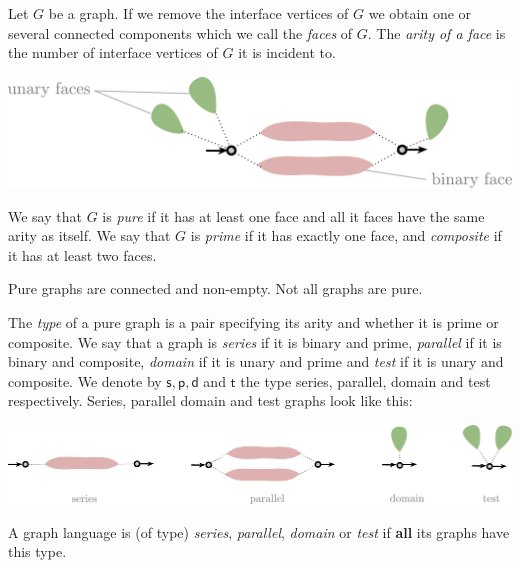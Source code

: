 \begin{definition}
Let $G$ be a graph. If we remove the interface vertices of $G$ we obtain one or several connected components which we call the \emph{faces} of $G$. 
The \emph{arity of a face} is the number of interface vertices of $G$ it is incident to. 
\begin{center}
\includegraphics[scale=.4]{Pictures/unary-and-binary-faces}
\end{center}
\noindent We say that $G$ is \emph{pure} if  it has at least one face and  all it faces have the same arity as itself.  We say that $G$ is \emph{prime} if it has exactly one face, and \emph{composite} if it has at least two faces. 
\end{definition}


   \begin{remark} Pure graphs are connected and non-empty.  Not all graphs are pure.
   \end{remark}

   \begin{definition}
The \emph{type} of a pure graph is a pair specifying its arity and whether it is prime or composite. We say that a graph is \emph{series} if it is binary and prime, \emph{parallel} if it is binary and composite, \emph{domain} if it is unary and prime and \emph{test} if it is unary and composite. We denote by $\mathsf{s}, \mathsf{p}, \mathsf{d}$ and $\mathsf{t}$ the type series, parallel, domain and test respectively. Series, parallel domain and test graphs look like this:
   \begin{center}
   \includegraphics[scale=.4]{Pictures/spdt}
   \end{center}
   A graph language is (of type) \emph{series}, \emph{parallel}, \emph{domain} or \emph{test} if \textbf{all} its graphs have this type.  
   \end{definition}
   
